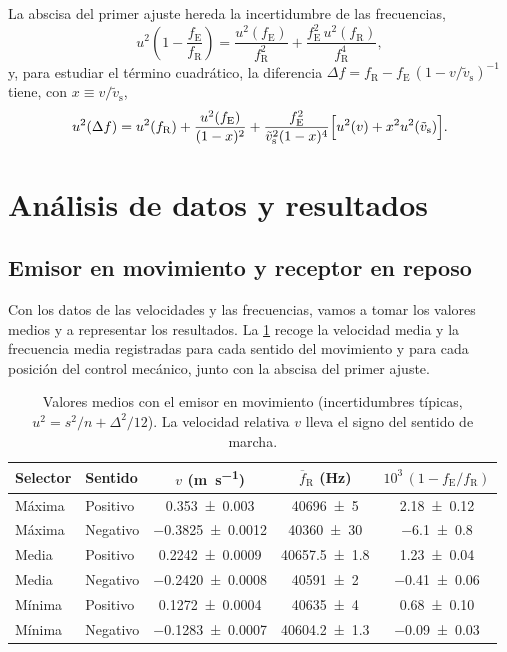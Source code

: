 \documentclass[a4paper,11pt]{amsart}
\numberwithin{equation}{section}
\newcommand{\vst}{\tilde{v}_{\mathrm{s}}}     %
\newcommand{\fE}{f_{\mathrm{E}}}              %
\newcommand{\fR}{f_{\mathrm{R}}}              %
\newcommand{\mean}[1]{\overline{#1}}
\theoremstyle{cienplano}
\theoremstyle{ciendef}
\theoremstyle{cienobs}
\begin{document}
La abscisa del primer ajuste hereda la incertidumbre de las frecuencias,
\begin{equation}\label{eq:ux}
  u^{2}\!\left(1-\frac{\fE}{\fR}\right)=\frac{u^{2}(\fE)}{\fR^{2}}+\frac{\fE^{2}\,u^{2}(\fR)}{\fR^{4}},
\end{equation}
y, para estudiar el término cuadrático, la diferencia
$\Delta f=\fR-\fE\,(1-v/\vst)^{-1}$ tiene, con $x\equiv v/\vst$,
\begin{equation}\label{eq:udf}
  u^{2}(\Delta f)=u^{2}(\fR)+\frac{u^{2}(\fE)}{(1-x)^{2}}
  +\frac{\fE^{2}}{\vst^{2}(1-x)^{4}}\Bigl[u^{2}(v)+x^{2}u^{2}(\vst)\Bigr].
\end{equation}

\newpage
\section{Análisis de datos y resultados}\label{sec:analisis}
\subsection{Emisor en movimiento y receptor en reposo}
Con los datos de las velocidades y las frecuencias, vamos a tomar los valores
medios y a representar los resultados. La \cref{tab:mediasE} recoge la velocidad
media y la frecuencia media registradas para cada sentido del movimiento y para
cada posición del control mecánico, junto con la abscisa del primer ajuste.

\begin{table}[ht]
\centering
\caption{Valores medios con el emisor en movimiento (incertidumbres típicas,
$u^{2}=s^{2}/n+\Delta^{2}/12$). La velocidad relativa $v$ lleva el signo del
sentido de marcha.}
\label{tab:mediasE}
\small
\renewcommand{\arraystretch}{1.25}
\begin{tabular}{@{}llccc@{}}
\toprule
Selector & Sentido & $v$ (\si{\meter\per\second}) & $\mean{f}_{\mathrm{R}}$ (\si{\hertz}) & $10^{3}\,(1-\fE/\fR)$\\
\midrule
Máxima & Positivo & \num{0,353 +- 0,003} & \num{40696 +- 5} & \num{2,18 +- 0,12}\\
Máxima & Negativo & \num{-0,3825 +- 0,0012} & \num{40360 +- 30} & \num{-6,1 +- 0,8}\\
Media & Positivo & \num{0,2242 +- 0,0009} & \num{40657,5 +- 1,8} & \num{1,23 +- 0,04}\\
Media & Negativo & \num{-0,2420 +- 0,0008} & \num{40591 +- 2} & \num{-0,41 +- 0,06}\\
Mínima & Positivo & \num{0,1272 +- 0,0004} & \num{40635 +- 4} & \num{0,68 +- 0,10}\\
Mínima & Negativo & \num{-0,1283 +- 0,0007} & \num{40604,2 +- 1,3} & \num{-0,09 +- 0,03}\\
\bottomrule
\end{tabular}
\end{table}
\end{document}
